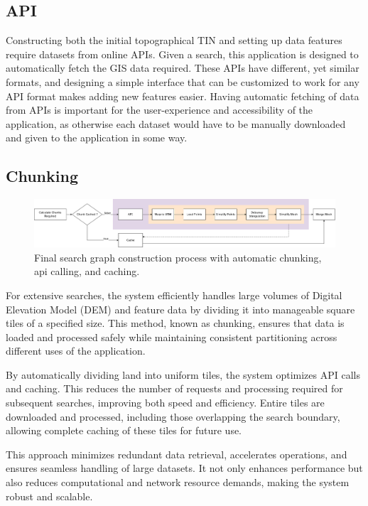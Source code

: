 \documentclass[12pt]{article}
\begin{document}
\subsection{API}

Constructing both the initial topographical TIN and setting up data features require datasets from online APIs. Given a search, this application is designed to automatically fetch the GIS data required. These APIs have different, yet similar formats, and designing a simple interface that can be customized to work for any API format makes adding new features easier. Having automatic fetching of data from APIs is important for the user-experience and accessibility of the application, as otherwise each dataset would have to be manually downloaded and given to the application in some way.

\subsection{Chunking}

\begin{figure}[!htbp]
  \centering
  \includegraphics[width=1\textwidth]{assets/meshConstruction.png}
  \caption{Final search graph construction process with automatic chunking, api calling, and caching.}\label{fig:meshConstruction:full}
\end{figure}

For extensive searches, the system efficiently handles large volumes of Digital Elevation Model (DEM) and feature data by dividing it into manageable square tiles of a specified size. This method, known as chunking, ensures that data is loaded and processed safely while maintaining consistent partitioning across different uses of the application.

By automatically dividing land into uniform tiles, the system optimizes API calls and caching. This reduces the number of requests and processing required for subsequent searches, improving both speed and efficiency. Entire tiles are downloaded and processed, including those overlapping the search boundary, allowing complete caching of these tiles for future use.

This approach minimizes redundant data retrieval, accelerates operations, and ensures seamless handling of large datasets. It not only enhances performance but also reduces computational and network resource demands, making the system robust and scalable.
\end{document}
